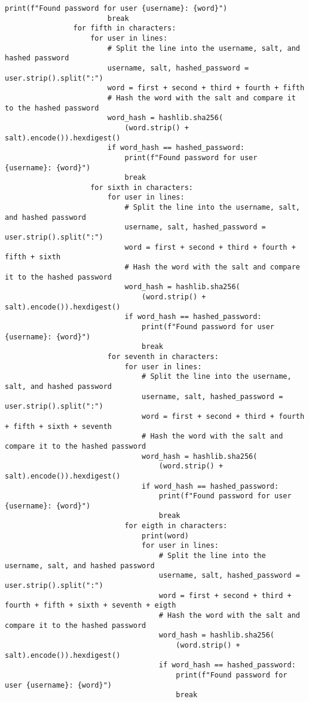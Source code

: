 \documentclass{article}
\begin{document}
\begin{lstlisting}[basicstyle=\tiny]
                        print(f"Found password for user {username}: {word}")
                        break
                for fifth in characters:
                    for user in lines:
                        # Split the line into the username, salt, and hashed password
                        username, salt, hashed_password = user.strip().split(":")
                        word = first + second + third + fourth + fifth
                        # Hash the word with the salt and compare it to the hashed password
                        word_hash = hashlib.sha256(
                            (word.strip() + salt).encode()).hexdigest()
                        if word_hash == hashed_password:
                            print(f"Found password for user {username}: {word}")
                            break
                    for sixth in characters:
                        for user in lines:
                            # Split the line into the username, salt, and hashed password
                            username, salt, hashed_password = user.strip().split(":")
                            word = first + second + third + fourth + fifth + sixth
                            # Hash the word with the salt and compare it to the hashed password
                            word_hash = hashlib.sha256(
                                (word.strip() + salt).encode()).hexdigest()
                            if word_hash == hashed_password:
                                print(f"Found password for user {username}: {word}")
                                break
                        for seventh in characters:
                            for user in lines:
                                # Split the line into the username, salt, and hashed password
                                username, salt, hashed_password = user.strip().split(":")
                                word = first + second + third + fourth + fifth + sixth + seventh
                                # Hash the word with the salt and compare it to the hashed password
                                word_hash = hashlib.sha256(
                                    (word.strip() + salt).encode()).hexdigest()
                                if word_hash == hashed_password:
                                    print(f"Found password for user {username}: {word}")
                                    break
                            for eigth in characters:
                                print(word)
                                for user in lines:
                                    # Split the line into the username, salt, and hashed password
                                    username, salt, hashed_password = user.strip().split(":")
                                    word = first + second + third + fourth + fifth + sixth + seventh + eigth
                                    # Hash the word with the salt and compare it to the hashed password
                                    word_hash = hashlib.sha256(
                                        (word.strip() + salt).encode()).hexdigest()
                                    if word_hash == hashed_password:
                                        print(f"Found password for user {username}: {word}")
                                        break
\end{lstlisting}
\end{document}
